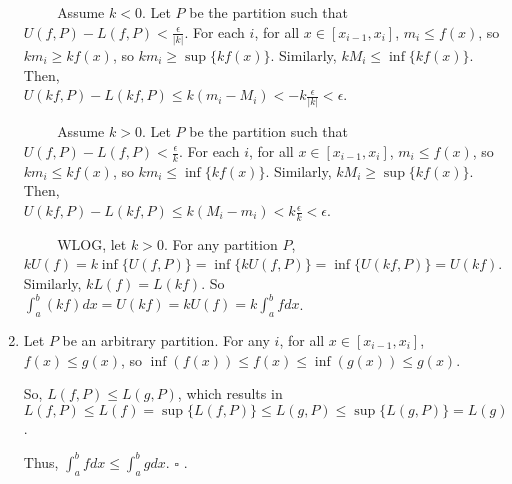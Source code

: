 \documentclass{article}
\begin{document}
\begin{enumerate}
    $\hspace{1cm}$Assume $k < 0$. Let $P$ be the partition such that $U(f, P) - L(f,P) < \frac{\epsilon}{|k|}$. For each $i$, for all $x \in [x_{i-1}, x_i]$, $m_i \le f(x)$, so $km_i \geq kf(x)$, so $km_i \geq \sup\{kf(x)\}$. Similarly, $kM_i \le \inf \{ kf(x)\}$. Then, \\$U(kf, P) - L(kf, P) \le k(m_i - M_i) < -k\frac{\epsilon}{|k|} < \epsilon$.

    $\hspace{1cm}$Assume $k > 0$. Let $P$ be the partition such that $U(f, P) - L(f,P) < \frac{\epsilon}{k}$. For each $i$, for all $x \in [x_{i-1}, x_i]$, $m_i \le f(x)$, so $km_i \le kf(x)$, so $km_i \le \inf\{kf(x)\}$. Similarly, $kM_i \geq \sup \{ kf(x)\}$. Then, \\$U(kf, P) - L(kf, P) \le k(M_i - m_i) < k\frac{\epsilon}{k} < \epsilon$.

    $\hspace{1cm}$WLOG, let $k > 0$. For any partition $P$, $kU(f) = k\inf\{U(f,P)\} = \inf\{kU(f,P)\} = \inf\{U(kf, P)\} = U(kf)$. Similarly, $kL(f) = L(kf)$. So $\int_a^b(kf)dx = U(kf) = kU(f)= k\int_a^bfdx$.

    \item Let $P$ be an arbitrary partition. For any $i$, for all $x \in [x_{i-1}, x_i]$, \\$f(x) \le g(x)$, so $\inf(f(x)) \le f(x) \le \inf(g(x)) \le g(x)$. 
    
    So, $L(f, P) \le L(g,P)$, which results in \\$L(f,P) \le L(f) = \sup\{L(f, P)\} \le L(g, P) \le \sup\{L(g,P)\} = L(g)$. 
    
    Thus, $\int_a^bfdx\leq\int_a^bgdx$. $\square$
. \end{enumerate}
\end{document}
